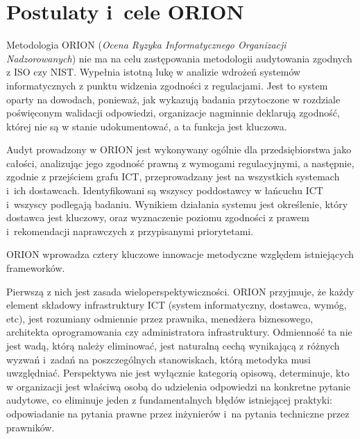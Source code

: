 \section{Postulaty i~cele ORION}

Metodologia ORION (\textit{Ocena Ryzyka Informatycznego Organizacji Nadzorowanych}) nie ma na celu zastępowania metodologii audytowania zgodnych z ISO czy NIST. Wypełnia istotną lukę
w analizie wdrożeń systemów informatycznych z punktu widzenia zgodności z regulacjami. Jest to system oparty na dowodach, ponieważ, jak wykazują badania przytoczone w rozdziale
poświęconym walidacji odpowiedzi, organizacje nagminnie deklarują zgodność, której nie są w stanie udokumentować, a ta funkcja jest kluczowa.

Audyt prowadzony w ORION jest wykonywany ogólnie dla przedsiębiorstwa jako całości, analizując jego zgodność prawną z wymogami regulacyjnymi, a następnie,  zgodnie z przejściem grafu ICT, przeprowadzany jest na wszystkich systemach i~ich dostawcach. Identyfikowani są wszyscy
poddostawcy w łańcuchu ICT i~wszyscy podlegają badaniu. Wynikiem działania systemu jest określenie, który dostawca jest kluczowy, oraz wyznaczenie poziomu zgodności z prawem i~rekomendacji naprawczych z przypisanymi priorytetami.

ORION wprowadza cztery kluczowe innowacje metodyczne względem istniejących frameworków.

Pierwszą z nich jest zasada wieloperspektywiczności. ORION przyjmuje, że każdy element składowy infrastruktury ICT (system informatyczny, dostawca, wymóg, etc), jest rozumiany odmiennie przez prawnika, menedżera biznesowego, architekta oprogramowania czy administratora infrastruktury. Odmienność ta nie jest wadą, którą należy eliminować, jest naturalną cechą wynikającą z różnych wyzwań i~zadań na poszczególnych stanowiskach, którą metodyka musi uwzględniać. Perspektywa nie jest wyłącznie kategorią opisową, determinuje, kto w organizacji jest właściwą osobą do udzielenia odpowiedzi na konkretne pytanie audytowe, co eliminuje jeden z fundamentalnych błędów istniejącej praktyki: odpowiadanie na pytania prawne przez inżynierów i~na pytania techniczne przez prawników.

